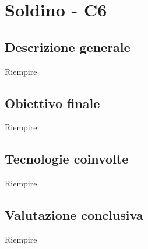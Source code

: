 \section{Soldino - C6} \label{c6}
    \subsection{Descrizione generale}
    Riempire

    \subsection{Obiettivo finale}
    Riempire

    \subsection{Tecnologie coinvolte}
    Riempire

    \subsection{Valutazione conclusiva}
    Riempire
